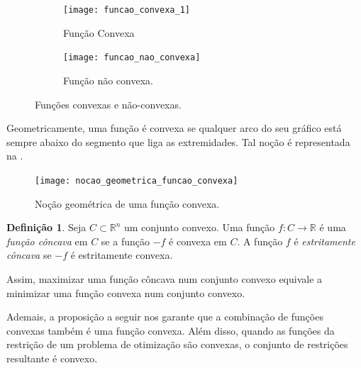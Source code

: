 \documentclass[12pt,a4paper]{scrartcl}
\def\RR{\mathds{R}}
\theoremstyle{definition}%
\newtheorem{defi}{Definição}
\begin{document}
\begin{figure}[!ht] 
\centering
\begin{subfigure}[h]{0.42\textwidth}
\centering
\texttt{[image: funcao\_convexa\_1]}
\caption{Função Convexa \label{fig:funcao_convexa}}
\end{subfigure}
\begin{subfigure}[!ht]{0.40\textwidth}
	\centering
	\texttt{[image: funcao\_nao\_convexa]}
	\caption{Função não convexa. \label{fig:funcao_nao_convexa}}
\end{subfigure}
\caption{Funções convexas e não-convexas. \label{fig:exemplos_funcao_convexa}}
\end{figure}
Geometricamente, uma função é convexa se qualquer arco do seu gráfico está sempre abaixo do segmento que liga as extremidades. Tal noção é representada na . 

\begin{figure}[!ht] 
	\centering
	\texttt{[image: nocao\_geometrica\_funcao\_convexa]}
	\caption{Noção geométrica de uma função convexa. \label{fig:nocao_funcao_convexa}}
\end{figure}

\begin{defi}
Seja $C \subset \RR^{n}$ um conjunto convexo. Uma função $f: C \rightarrow \RR $ é uma \emph{função côncava} em $C$ se a função $-f$ é convexa em $C$. A função $f$ é \emph{estritamente côncava} se $-f$ é estritamente convexa.
\end{defi}

Assim, maximizar uma função côncava num conjunto convexo equivale a minimizar uma função convexa num conjunto convexo.

Ademais, a proposição a seguir nos garante que a combinação de funções convexas também é uma função convexa. Além disso, quando as funções da restrição de um problema de otimização são convexas, o conjunto de restrições resultante é convexo.
\end{document}
